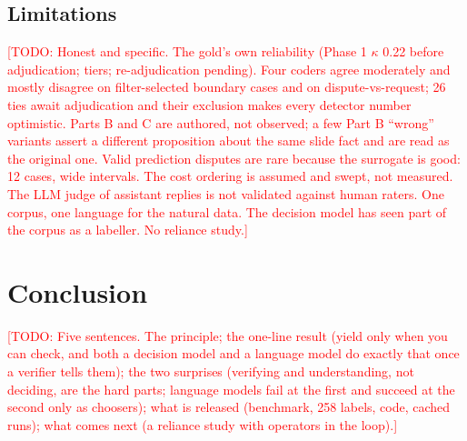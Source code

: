 \documentclass[preprint,12pt,3p,times]{elsarticle}
\newcommand{\todo}[1]{\textcolor{red}{[TODO: #1]}}
\begin{document}
\subsection{Limitations}
\todo{Honest and specific. The gold's own reliability (Phase 1 $\kappa$ 0.22 before adjudication; tiers; re-adjudication pending). Four coders agree moderately and mostly disagree on filter-selected boundary cases and on dispute-vs-request; 26 ties await adjudication and their exclusion makes every detector number optimistic. Parts B and C are authored, not observed; a few Part B ``wrong'' variants assert a different proposition about the same slide fact and are read as the original one. Valid prediction disputes are rare because the surrogate is good: 12 cases, wide intervals. The cost ordering is assumed and swept, not measured. The LLM judge of assistant replies is not validated against human raters. One corpus, one language for the natural data. The decision model has seen part of the corpus as a labeller. No reliance study.}

\section{Conclusion}
\todo{Five sentences. The principle; the one-line result (yield only when you can check, and both a decision model and a language model do exactly that once a verifier tells them); the two surprises (verifying and understanding, not deciding, are the hard parts; language models fail at the first and succeed at the second only as choosers); what is released (benchmark, 258 labels, code, cached runs); what comes next (a reliance study with operators in the loop).}



\end{document}
